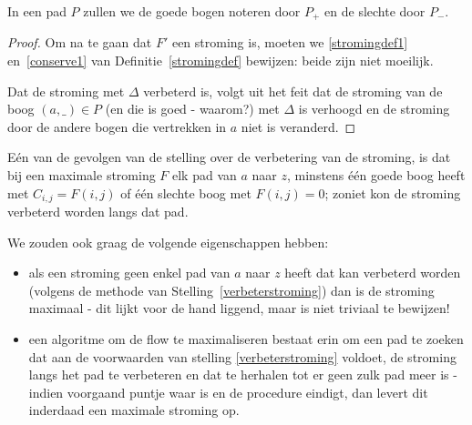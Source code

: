 In een pad $P$ zullen we de goede bogen noteren door $P_{+}$ en de
slechte door $P_{-}$.


\begin{proof} Om na te gaan dat $F'$ een stroming is, moeten we
\ref{stromingdef1} en~\ref{conserve1} van Definitie~\ref{stromingdef}
bewijzen: beide zijn niet moeilijk.

Dat de stroming met $\Delta$ verbeterd is, volgt uit het feit dat de
stroming van de boog $(a,\_) \in P$ (en die is goed - waarom?) met
$\Delta$ is verhoogd en de stroming door de andere bogen die vertrekken
in $a$ niet is veranderd.  \end{proof}



E\'{e}n van de gevolgen van de stelling over de verbetering van de
stroming, is dat bij een maximale stroming $F$ elk pad van $a$ naar $z$,
minstens \'{e}\'{e}n goede boog heeft met $C_{i,j} = F(i,j)$ of
\'{e}\'{e}n slechte boog met $F(i,j) = 0$; zoniet kon de stroming
verbeterd worden langs dat pad.

We zouden ook graag de volgende eigenschappen hebben:
\begin{itemize}
\item
als een stroming geen enkel pad van $a$ naar $z$ heeft dat kan verbeterd
worden (volgens de methode van Stelling~\ref{verbeterstroming}) dan is
de stroming maximaal - dit lijkt voor de hand liggend, maar is niet
triviaal te bewijzen!
\item
een algoritme om de flow te maximaliseren bestaat erin om
een pad te zoeken dat aan de voorwaarden van stelling
\ref{verbeterstroming} voldoet, de stroming langs het pad te verbeteren en
dat te herhalen tot er geen zulk pad meer is - indien voorgaand
puntje waar is en de procedure eindigt, dan levert dit inderdaad een
maximale stroming op.
\end{itemize}


